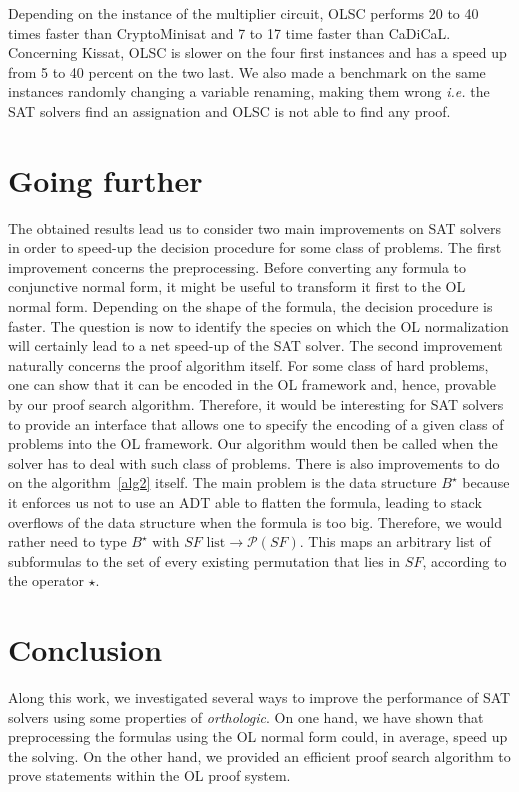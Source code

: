 \documentclass[a4paper, 11pt]{article}
\newcommand{\ie}{ \textit{i.e.} }
\begin{document}
    Depending on the instance of the multiplier circuit, OLSC
    performs 20 to 40 times faster than CryptoMinisat and 7 to 17 time faster than CaDiCaL. 
    Concerning Kissat,
    OLSC is slower on the four first instances and has a speed up from 5 to 40 percent on the two last.
    We also made a benchmark on the same instances randomly changing a variable renaming, making them 
    wrong \ie the SAT solvers find an assignation and OLSC is not able to find any proof.

    \section{Going further}
    The obtained results lead us to consider two main improvements on SAT solvers in order to speed-up 
    the decision procedure for some class of problems. 
    The first improvement concerns the preprocessing. Before converting any formula to
    conjunctive normal form, it might be useful to transform it first to the OL normal form. Depending
    on the shape of the formula, the decision procedure is faster. The question is now to identify the
    species on which the OL normalization will certainly lead to a net speed-up of the SAT solver. 
    The second improvement naturally 
    concerns the proof algorithm itself. For some class of hard problems, one can show that it can be
    encoded in the OL framework and, hence, provable by our proof search algorithm. Therefore, it
    would be interesting for SAT solvers to provide an interface that allows one to specify the
    encoding of a given class of problems into the OL framework. Our algorithm would then be called
    when the solver has to deal with such class of problems. There is also improvements to do on the
    algorithm~\ref{alg2} itself. The main problem is the data structure $B^\star$ because it enforces
    us not to use an ADT able to flatten the formula, leading to stack overflows of the data structure
    when the formula is too big. Therefore, we would rather need to type $B^\star$ with 
    $SF\text{ list}\rightarrow\mathcal{P}(SF)$. This maps an arbitrary list of subformulas to
    the set of every existing permutation that lies in $SF$, according to the operator $\star$.
    \section{Conclusion} 
    Along this work, we investigated several ways to improve the performance of SAT solvers using
    some properties of \textit{orthologic}. On one hand, we have shown that preprocessing the formulas 
    using the OL normal form could, in average, speed up the solving. On the other hand, we provided an
    efficient proof search algorithm to prove statements within the OL proof system.
    
    
\end{document}
